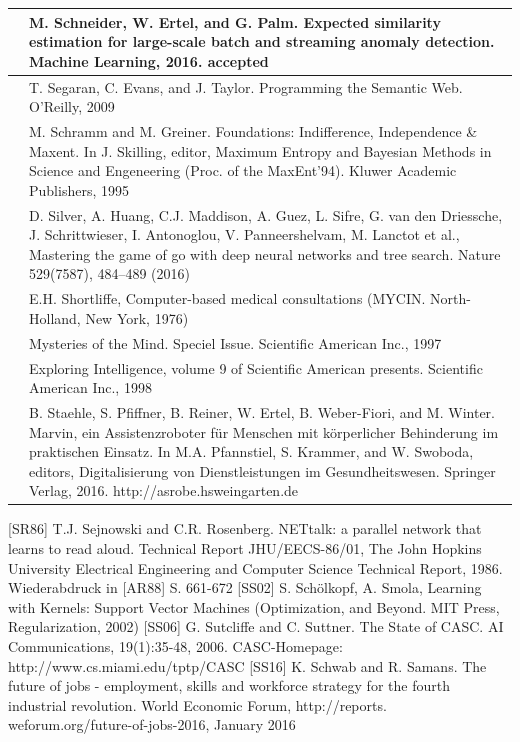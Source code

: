 \documentclass[10pt]{book}
\begin{document}
\begin{tabular}{|l|l|}
\hline [SEP16] & M. Schneider, W. Ertel, and G. Palm. Expected similarity estimation for large-scale batch and streaming anomaly detection. Machine Learning, 2016. accepted \\
\hline [SET09] & T. Segaran, C. Evans, and J. Taylor. Programming the Semantic Web. O'Reilly, 2009 \\
\hline [\cite{schramm1995foundations}] & M. Schramm and M. Greiner. Foundations: Indifference, Independence \& Maxent. In J. Skilling, editor, Maximum Entropy and Bayesian Methods in Science and Engeneering (Proc. of the MaxEnt'94). Kluwer Academic Publishers, 1995 \\
\hline [SHM+16] & D. Silver, A. Huang, C.J. Maddison, A. Guez, L. Sifre, G. van den Driessche, J. Schrittwieser, I. Antonoglou, V. Panneershelvam, M. Lanctot et al., Mastering the game of go with deep neural networks and tree search. Nature 529(7587), 484--489 (2016) \\
\hline [Sho76] & E.H. Shortliffe, Computer-based medical consultations (MYCIN. North-Holland, New York, 1976) \\
\hline [Spe97] & Mysteries of the Mind. Speciel Issue. Scientific American Inc., 1997 \\
\hline [Spe98] & Exploring Intelligence, volume 9 of Scientific American presents. Scientific American Inc., 1998 \\
\hline [SPR+16] & B. Staehle, S. Pfiffner, B. Reiner, W. Ertel, B. Weber-Fiori, and M. Winter. Marvin, ein Assistenzroboter für Menschen mit körperlicher Behinderung im praktischen Einsatz. In M.A. Pfannstiel, S. Krammer, and W. Swoboda, editors, Digitalisierung von Dienstleistungen im Gesundheitswesen. Springer Verlag, 2016. http://asrobe.hsweingarten.de \\
\hline
\end{tabular}
[SR86] T.J. Sejnowski and C.R. Rosenberg. NETtalk: a parallel network that learns to read aloud. Technical Report JHU/EECS-86/01, The John Hopkins University Electrical Engineering and Computer Science Technical Report, 1986. Wiederabdruck in [AR88] S. 661-672
[SS02] S. Schölkopf, A. Smola, Learning with Kernels: Support Vector Machines (Optimization, and Beyond. MIT Press, Regularization, 2002)
[SS06] G. Sutcliffe and C. Suttner. The State of CASC. AI Communications, 19(1):35-48, 2006. CASC-Homepage: http://www.cs.miami.edu/tptp/CASC
[SS16] K. Schwab and R. Samans. The future of jobs - employment, skills and workforce strategy for the fourth industrial revolution. World Economic Forum, http://reports. weforum.org/future-of-jobs-2016, January 2016
\end{document}
